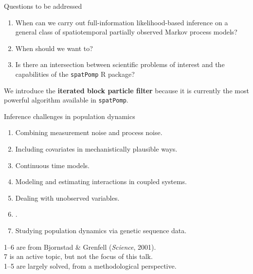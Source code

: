 \documentclass{beamer}
\begin{document}
\begin{frame}{Questions to be addressed}

  \begin{enumerate}
  \item When can we carry out full-information likelihood-based inference on a general class of spatiotemporal partially observed Markov process models?
  \item When should we want to?
  \item Is there an intersection between scientific problems of interest and the capabilities of the \texttt{spatPomp} R package?
  \end{enumerate}

  \vspace{10mm}

  We introduce the {\bf iterated block particle filter} because it is currently the most powerful algorithm available in \texttt{spatPomp}.

\end{frame}

\newcommand\challengeSep{\vspace{3mm}}

\begin{frame}{Inference challenges in population dynamics}

  \begin{enumerate}
\item Combining measurement noise and process noise.
\item Including covariates in mechanistically plausible ways.
\item  Continuous time models.
\item  Modeling and estimating interactions in coupled systems.
\item  Dealing with unobserved variables.
\item  {}.
\item  Studying population dynamics via genetic sequence data.
  \end{enumerate}

  \vspace{3mm}
  
  1--6 are from Bjornstad \& Grenfell ({\it Science}, 2001).\\
  7 is an active topic, but not the focus of this talk.\\
  1--5 are largely solved, from a methodological perspective.
  
  
\end{frame}
\end{document}
